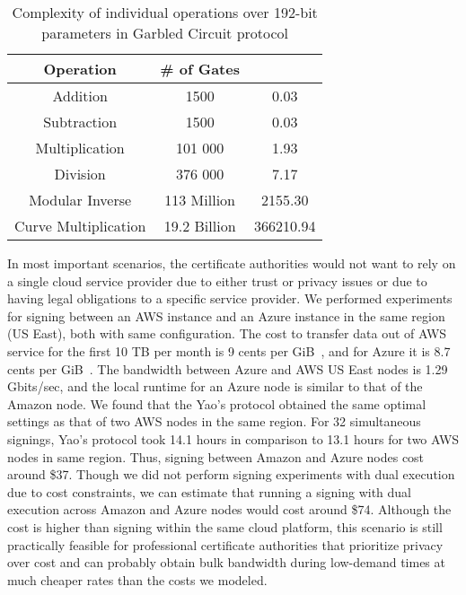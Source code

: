 \begin{table}[tb]
    \centering
    \begin{tabular}{|c|c|S[table-format=6.2]|}
        \hline
        Operation & \# of Gates & \\ \hline
        Addition & 1500 & 0.03 \\
        Subtraction & 1500 & 0.03 \\
        Multiplication & 101 000 & 1.93 \\
        Division & 376 000 & 7.17 \\
        Modular Inverse & 113 Million & 2155.30 \\
        Curve Multiplication & 19.2 Billion & 366210.94 \\ \hline
    \end{tabular}
    \caption{Complexity of individual operations over 192-bit parameters in Garbled Circuit protocol}
    \label{table:operation_cost}
\end{table}

 In most important scenarios, the certificate authorities would not want to rely on a single cloud service provider due to either trust or privacy issues or due to having legal obligations to a specific service provider. We performed experiments for signing between an AWS instance and an Azure instance in the same region (US East), both with same configuration.  The cost to transfer data out of AWS service for the first 10 TB per month is 9 cents per GiB~\cite{ec2_instance_pricing}, and for Azure it is 8.7 cents per GiB~\cite{azure_instance_pricing}. The bandwidth between Azure and AWS US East nodes is 1.29 Gbits/sec, and the local runtime for an Azure node is similar to that of the Amazon node. We found that the Yao's protocol obtained the same optimal settings as that of two AWS nodes in the same region. For 32 simultaneous signings, Yao's protocol took 14.1 hours in comparison to 13.1 hours for two AWS nodes in same region. Thus, signing between Amazon and Azure nodes cost around \$37. Though we did not perform signing experiments with dual execution due to cost constraints, we can estimate that running a signing with dual execution across Amazon and Azure nodes would cost around \$74. Although the cost is higher than signing within the same cloud platform, this scenario is still practically feasible for professional certificate authorities that prioritize privacy over cost and can probably obtain bulk bandwidth during low-demand times at much cheaper rates than the costs we modeled.

